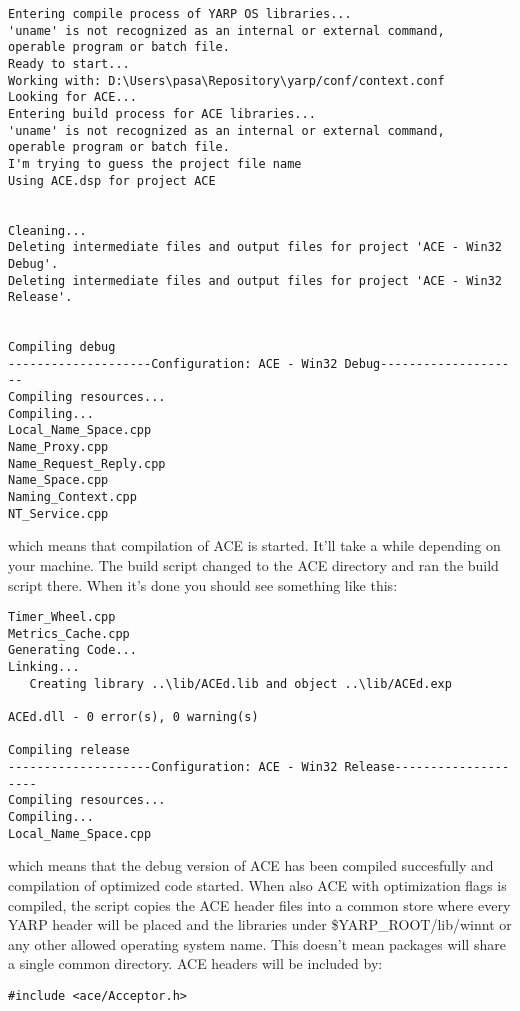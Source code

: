 \begin{verbatim}
Entering compile process of YARP OS libraries...
'uname' is not recognized as an internal or external command,
operable program or batch file.
Ready to start...
Working with: D:\Users\pasa\Repository\yarp/conf/context.conf
Looking for ACE...
Entering build process for ACE libraries...
'uname' is not recognized as an internal or external command,
operable program or batch file.
I'm trying to guess the project file name
Using ACE.dsp for project ACE


Cleaning...
Deleting intermediate files and output files for project 'ACE - Win32 Debug'.
Deleting intermediate files and output files for project 'ACE - Win32 Release'.


Compiling debug
--------------------Configuration: ACE - Win32 Debug--------------------
Compiling resources...
Compiling...
Local_Name_Space.cpp
Name_Proxy.cpp
Name_Request_Reply.cpp
Name_Space.cpp
Naming_Context.cpp
NT_Service.cpp

\end{verbatim} 

\noindent which means that compilation of ACE is started. It'll take a while depending on your machine. The build script changed to the ACE directory and ran the build script there. When it's done you should see something like this:

\begin{verbatim}
Timer_Wheel.cpp
Metrics_Cache.cpp
Generating Code...
Linking...
   Creating library ..\lib/ACEd.lib and object ..\lib/ACEd.exp

ACEd.dll - 0 error(s), 0 warning(s)

Compiling release
--------------------Configuration: ACE - Win32 Release--------------------
Compiling resources...
Compiling...
Local_Name_Space.cpp

\end{verbatim}

\noindent which means that the debug version of ACE has been compiled succesfully and compilation of optimized code started. When also ACE with optimization flags is compiled, the script copies the ACE header files into a common store where every YARP header will be placed and the libraries under \$YARP\_ROOT/lib/winnt or any other allowed operating system name. This doesn't mean packages will share a single common directory. ACE headers will be included by:

\begin{verbatim}
#include <ace/Acceptor.h>
\end{verbatim}

